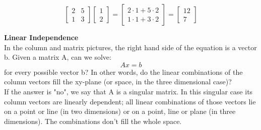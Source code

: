\documentclass{ximera}
\begin{document}
\[\begin{bmatrix} 2 & 5\\ 1 & 3 \end{bmatrix} \begin{bmatrix} 1\\2 \end{bmatrix} = \begin{bmatrix} 2 \cdot 1 + 5 \cdot 2\\ 1 \cdot 1 + 3 \cdot 2 \end{bmatrix} = \begin{bmatrix} 12\\7 \end{bmatrix}\]

\noindent
\textbf{Linear Independence} \\

\noindent
In the column and matrix pictures, the right hand side of the equation is a vector b. Given a matrix A, can we solve:
\[Ax = b\]
\noindent
for every possible vector b? In other words, do the linear combinations of the column vectors fill the xy-plane (or space, in the three dimensional case)? \\

\noindent
If the answer is "no", we say that A is a singular matrix. In this singular case its column vectors are linearly dependent; all linear combinations of those vectors lie on a point or line (in two dimensions) or on a point, line or plane (in three dimensions). The combinations don't fill the whole space.
\end{document}
